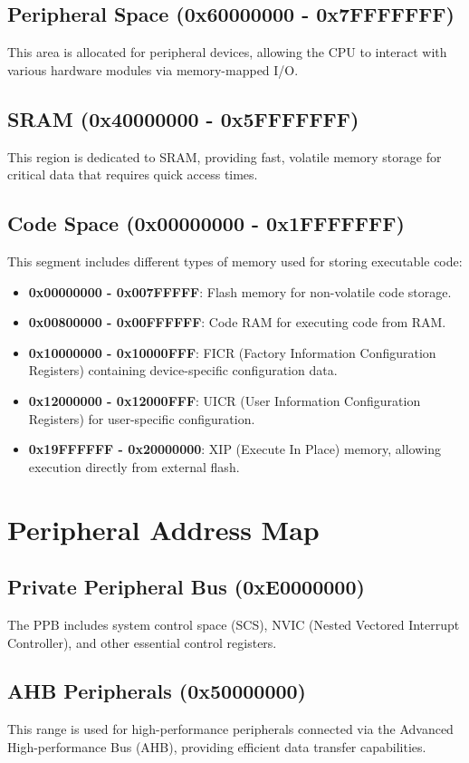\documentclass{Configuration_Files/PoliMi3i_thesis}
\begin{document}
\subsection{Peripheral Space (0x60000000 - 0x7FFFFFFF)}
This area is allocated for peripheral devices, allowing the CPU to interact with various hardware modules via memory-mapped I/O.

\subsection{SRAM (0x40000000 - 0x5FFFFFFF)}
This region is dedicated to SRAM, providing fast, volatile memory storage for critical data that requires quick access times.

\subsection{Code Space (0x00000000 - 0x1FFFFFFF)}
This segment includes different types of memory used for storing executable code:
\begin{itemize}
    \item \textbf{0x00000000 - 0x007FFFFF}: Flash memory for non-volatile code storage.
    \item \textbf{0x00800000 - 0x00FFFFFF}: Code RAM for executing code from RAM.
    \item \textbf{0x10000000 - 0x10000FFF}: FICR (Factory Information Configuration Registers) containing device-specific configuration data.
    \item \textbf{0x12000000 - 0x12000FFF}: UICR (User Information Configuration Registers) for user-specific configuration.
    \item \textbf{0x19FFFFFF - 0x20000000}: XIP (Execute In Place) memory, allowing execution directly from external flash.
\end{itemize}

\section{Peripheral Address Map}

\subsection{Private Peripheral Bus (0xE0000000)}
The PPB includes system control space (SCS), NVIC (Nested Vectored Interrupt Controller), and other essential control registers.

\subsection{AHB Peripherals (0x50000000)}
This range is used for high-performance peripherals connected via the Advanced High-performance Bus (AHB), providing efficient data transfer capabilities.
\end{document}
